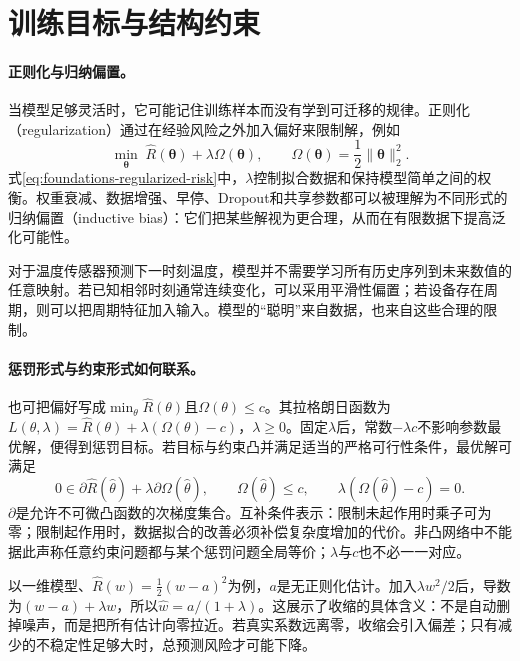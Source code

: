 \section{训练目标与结构约束}
\paragraph{正则化与归纳偏置。}
当模型足够灵活时，它可能记住训练样本而没有学到可迁移的规律。正则化（regularization）通过在经验风险之外加入偏好来限制解，例如
\begin{equation}
 \min_{\bm{\theta}}\;\hat{R}(\bm{\theta})+\lambda\Omega(\bm{\theta}),
 \qquad \Omega(\bm{\theta})=\frac12\|\bm{\theta}\|_2^2.\label{eq:foundations-regularized-risk}
\end{equation}
式\eqref{eq:foundations-regularized-risk}中，$\lambda$控制拟合数据和保持模型简单之间的权衡。权重衰减、数据增强、早停、Dropout和共享参数都可以被理解为不同形式的归纳偏置（inductive bias）：它们把某些解视为更合理，从而在有限数据下提高泛化可能性。

\begin{example}
 对于温度传感器预测下一时刻温度，模型并不需要学习所有历史序列到未来数值的任意映射。若已知相邻时刻通常连续变化，可以采用平滑性偏置；若设备存在周期，则可以把周期特征加入输入。模型的“聪明”来自数据，也来自这些合理的限制。
\end{example}

\paragraph{惩罚形式与约束形式如何联系。}
也可把偏好写成$\min_\theta\hat R(\theta)$且$\Omega(\theta)\leq c$。其拉格朗日函数为$L(\theta,\lambda)=\hat R(\theta)+\lambda(\Omega(\theta)-c)$，$\lambda\geq0$。固定$\lambda$后，常数$-\lambda c$不影响参数最优解，便得到惩罚目标。若目标与约束凸并满足适当的严格可行性条件，最优解可满足
\begin{equation}
 0\in\partial\hat R(\hat\theta)+\lambda\partial\Omega(\hat\theta),\qquad
 \Omega(\hat\theta)\leq c,\qquad
 \lambda(\Omega(\hat\theta)-c)=0.
\end{equation}
$\partial$是允许不可微凸函数的次梯度集合。互补条件表示：限制未起作用时乘子可为零；限制起作用时，数据拟合的改善必须补偿复杂度增加的代价。非凸网络中不能据此声称任意约束问题都与某个惩罚问题全局等价；$\lambda$与$c$也不必一一对应。

以一维模型、$\hat R(w)=\tfrac12(w-a)^2$为例，$a$是无正则化估计。加入$\lambda w^2/2$后，导数为$(w-a)+\lambda w$，所以$\hat w=a/(1+\lambda)$。这展示了收缩的具体含义：不是自动删掉噪声，而是把所有估计向零拉近。若真实系数远离零，收缩会引入偏差；只有减少的不稳定性足够大时，总预测风险才可能下降。

